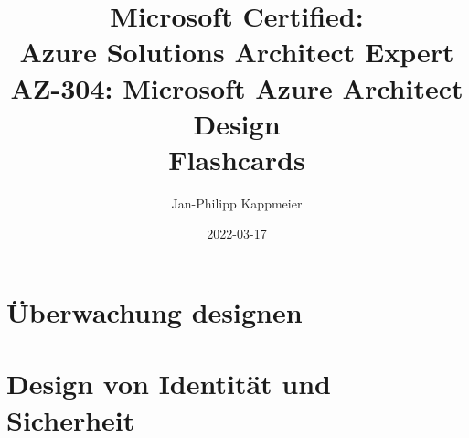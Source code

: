 \documentclass{scrartcl}
\newcommand{\sectioncard}[1]{
    \vspace*{\stretch{1}}
    \section{#1}
    \vspace*{\stretch{1}}
    \pagebreak
}
\begin{document}
    \title{Microsoft Certified:\\Azure Solutions Architect Expert\\\vspace{2mm}AZ-304: Microsoft Azure Architect Design\\Flashcards}
    \date{2022-03-17}
    \author{Jan-Philipp Kappmeier}

    \clearpage\maketitle
    \thispagestyle{empty}
    \pagebreak

    \sectioncard{Überwachung designen}

    
 
    
 
    \sectioncard{Design von Identität und Sicherheit}

    

    

    

    

    

    

    

    

    

    

    

    

    

    \doclicenseThis
    \pagebreak
\end{document}
